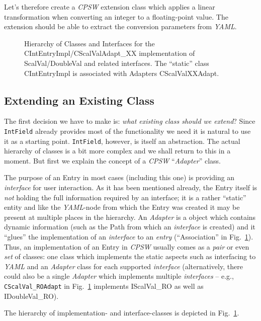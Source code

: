\documentclass[10pt]{article}
\newcommand{\ita}[1]{\emph{#1}}
\newcommand{\cpsw}      {\ita {CPSW}}
\newcommand{\yaml}      {\ita {YAML}}
\newcommand{\entry}     {{Entry}}
\newcommand{\Path}      {{Path}}
\newcommand{\cod}[1] {{\tt#1}}
\newcounter{figs}
\newcommand{\fig}[2]{
\refstepcounter{figs}
\hspace*{\fill}\resizebox{#1}{!}{\texttt{[image: \#2]}}\hspace*{\fill}
}
\newcommand{\figr}[1]{Fig.~\ref{fig:#1}}
\begin{document}
Let's therefore create a \cpsw{} extension class which applies a linear transformation
when converting an integer to a floating-point value. The extension should be able
to extract the conversion parameters from \yaml{}.

\begin{figure}[htb]
\fig{0.9\textwidth}{O.Common/classhier.pdf}
\label{fig:classhier}
\caption{Hierarchy of Classes and Interfaces for the CIntEntryImpl/CScalValAdapt\_XX 
implementation of ScalVal/DoubleVal and related interfaces. The ``static'' class
CIntEntryImpl is associated with Adapters CScalValXXAdapt.}
\end{figure}


\subsection{Extending an Existing Class}
The first decision we have to make is: {\em what existing class should we extend}?
Since \cod{IntField} already provides most of the functionality we need it is natural
to use it as a starting point. \cod{IntField}, however, is itself an abstraction. The
actual hierarchy of classes is a bit more complex and we shall return to this in a
moment. But first we explain the concept of a \cpsw{} ``{\em Adapter}'' class.

The purpose of an \entry{} in most cases (including this one) is providing an
{\em interface} for user interaction. As it has been mentioned already, the \entry{}
itself is {\em not} holding the full information required by an interface; it is
a rather ``static'' entity and like the \yaml{}-node from which the \entry{} was
created it may be present at multiple places in the hierarchy. An {\em Adapter}
is a object which contains dynamic information (such as the \Path{}
from which an {\em interface} is created) and it ``glues'' the implementation of
an {\em interface} to an {\em entry} (``Association'' in \figr{classhier}).
Thus, an implementation of an \entry{} in \cpsw{} usually comes as a {\em pair} or
even {\em set} of classes: one class which implements the static aspects such as
interfacing to \yaml{}  and an
{\em Adapter} class for each supported {\em interface} (alternatively, there could
also be a single {\em Adapter} which implements multiple {\em interfaces} -- e.g.,
\cod{CScalVal\_ROAdapt} in \figr{classhier} implements IScalVal\_RO as well
as IDoubleVal\_RO).

The hierarchy of implementation- and interface-classes is depicted in \figr{classhier}.
\end{document}
